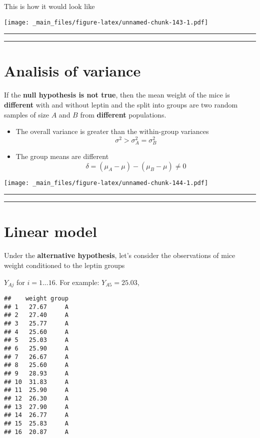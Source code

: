 \documentclass[
]{book}
\begin{document}
This is how it would look like

\texttt{[image: \_main\_files/figure-latex/unnamed-chunk-143-1.pdf]}

\begin{center}\rule{0.5\linewidth}{0.5pt}\end{center}

\begin{center}\rule{0.5\linewidth}{0.5pt}\end{center}

\hypertarget{analisis-of-variance}{%
\section{Analisis of variance}\label{analisis-of-variance}}

If the \textbf{null hypothesis is not true}, then the mean weight of the mice is \textbf{different} with and without leptin and the split into groups are two random samples of size \(A\) and \(B\) from \textbf{different} populations.

\begin{itemize}
\item
  The overall variance is greater than the within-group variances \[\sigma^2> \sigma^2_A=\sigma^2_B\]
\item
  The group means are different \[\delta=(\mu_A-\mu)-(\mu_B-\mu)\neq 0\]
\end{itemize}

\texttt{[image: \_main\_files/figure-latex/unnamed-chunk-144-1.pdf]}

\begin{center}\rule{0.5\linewidth}{0.5pt}\end{center}

\begin{center}\rule{0.5\linewidth}{0.5pt}\end{center}

\hypertarget{linear-model}{%
\section{Linear model}\label{linear-model}}

Under the \textbf{alternative hypothesis}, let's consider the observations of mice weight conditioned to the leptin groups

\(Y_{Aj}\) for \(i=1...16\). For example: \(Y_{A5}=25.03\),

\begin{verbatim}
##    weight group
## 1   27.67     A
## 2   27.40     A
## 3   25.77     A
## 4   25.60     A
## 5   25.03     A
## 6   25.90     A
## 7   26.67     A
## 8   25.60     A
## 9   28.93     A
## 10  31.83     A
## 11  25.90     A
## 12  26.30     A
## 13  27.90     A
## 14  26.77     A
## 15  25.83     A
## 16  20.87     A
\end{verbatim}
\end{document}
